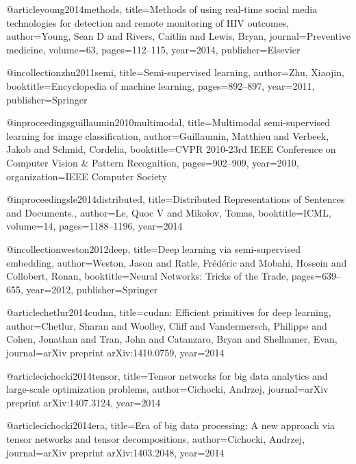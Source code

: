 @article{young2014methods,
  title={Methods of using real-time social media technologies for detection and remote monitoring of HIV outcomes},
  author={Young, Sean D and Rivers, Caitlin and Lewis, Bryan},
  journal={Preventive medicine},
  volume={63},
  pages={112--115},
  year={2014},
  publisher={Elsevier}
}


@incollection{zhu2011semi,
  title={Semi-supervised learning},
  author={Zhu, Xiaojin},
  booktitle={Encyclopedia of machine learning},
  pages={892--897},
  year={2011},
  publisher={Springer}
}

@inproceedings{guillaumin2010multimodal,
  title={Multimodal semi-supervised learning for image classification},
  author={Guillaumin, Matthieu and Verbeek, Jakob and Schmid, Cordelia},
  booktitle={CVPR 2010-23rd IEEE Conference on Computer Vision \& Pattern Recognition},
  pages={902--909},
  year={2010},
  organization={IEEE Computer Society}
}

@inproceedings{le2014distributed,
  title={Distributed Representations of Sentences and Documents.},
  author={Le, Quoc V and Mikolov, Tomas},
  booktitle={ICML},
  volume={14},
  pages={1188--1196},
  year={2014}
}

@incollection{weston2012deep,
  title={Deep learning via semi-supervised embedding},
  author={Weston, Jason and Ratle, Fr{\'e}d{\'e}ric and Mobahi, Hossein and Collobert, Ronan},
  booktitle={Neural Networks: Tricks of the Trade},
  pages={639--655},
  year={2012},
  publisher={Springer}
}

@article{chetlur2014cudnn,
  title={cudnn: Efficient primitives for deep learning},
  author={Chetlur, Sharan and Woolley, Cliff and Vandermersch, Philippe and Cohen, Jonathan and Tran, John and Catanzaro, Bryan and Shelhamer, Evan},
  journal={arXiv preprint arXiv:1410.0759},
  year={2014}
}



@article{cichocki2014tensor,
  title={Tensor networks for big data analytics and large-scale optimization problems},
  author={Cichocki, Andrzej},
  journal={arXiv preprint arXiv:1407.3124},
  year={2014}
}

@article{cichocki2014era,
  title={Era of big data processing: A new approach via tensor networks and tensor decompositions},
  author={Cichocki, Andrzej},
  journal={arXiv preprint arXiv:1403.2048},
  year={2014}
}

